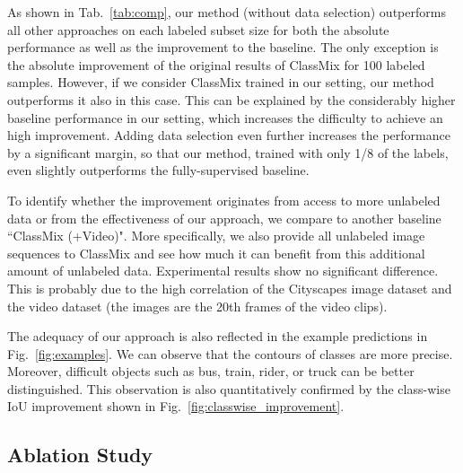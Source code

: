 \documentclass[final]{cvpr}
\begin{document}
As shown in Tab.~\ref{tab:comp}, our method (without data selection) outperforms all other approaches on each labeled subset size for both the absolute performance as well as the improvement to the baseline. The only exception is the absolute improvement of the original results of ClassMix for 100 labeled samples. However, if we consider ClassMix trained in our setting, our method outperforms it also in this case. This can be explained by the considerably higher baseline performance in our setting, which increases the difficulty to achieve an high improvement. 
Adding data selection even further increases the performance by a significant margin, so that our method, trained with only 1/8 of the labels, even slightly outperforms the fully-supervised baseline.

To identify whether the improvement originates from access to more unlabeled data or from the effectiveness of our approach, we compare to another baseline ``ClassMix (+Video)". More specifically, we also provide all unlabeled image sequences to ClassMix and see how much it can benefit from this additional amount of unlabeled data. Experimental results show no significant difference. This is probably due to the high correlation of the Cityscapes image dataset and the video dataset (the images are the 20th frames of the video clips).

The adequacy of our approach is also reflected in the example predictions in Fig.~\ref{fig:examples}. We can observe that the contours of classes are more precise. Moreover, difficult objects such as bus, train, rider, or truck can be better distinguished. This observation is also quantitatively confirmed by the class-wise IoU improvement shown in Fig.~\ref{fig:classwise_improvement}.

\subsection{Ablation Study}
\end{document}
